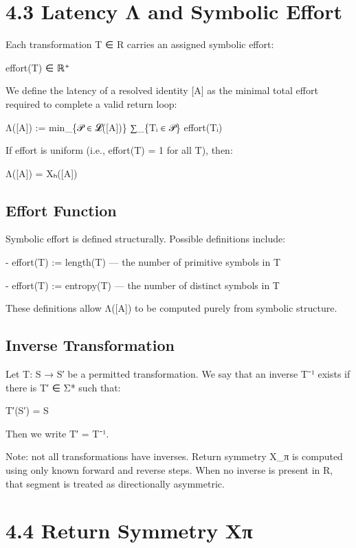 \section{4.3 \textbar{} Latency Λ and Symbolic
Effort}\label{latency-ux3bb-and-symbolic-effort}

Each transformation T ∈ R carries an assigned symbolic effort:

effort(T) ∈ ℝ⁺

We define the latency of a resolved identity {[}A{]} as the minimal
total effort required to complete a valid return loop:

Λ({[}A{]}) := min\_\{𝒫 ∈ 𝓛({[}A{]})\} ∑\_\{Tᵢ ∈ 𝒫\} effort(Tᵢ)

If effort is uniform (i.e., effort(T) = 1 for all T), then:

Λ({[}A{]}) = Xₕ({[}A{]})

\subsection{Effort Function}\label{effort-function}

Symbolic effort is defined structurally. Possible definitions include:

- effort(T) := length(T) --- the number of primitive symbols in T

- effort(T) := entropy(T) --- the number of distinct symbols in T

These definitions allow Λ({[}A{]}) to be computed purely from symbolic
structure.

\subsection{Inverse Transformation}\label{inverse-transformation}

Let T: S → S′ be a permitted transformation. We say that an inverse T⁻¹
exists if there is T′ ∈ Σ* such that:

T′(S′) = S

Then we write T′ = T⁻¹.

Note: not all transformations have inverses. Return symmetry X\_π is
computed using only known forward and reverse steps. When no inverse is
present in R, that segment is treated as directionally asymmetric.

\section{4.4 \textbar{} Return Symmetry
Xπ}\label{return-symmetry-xux3c0}

